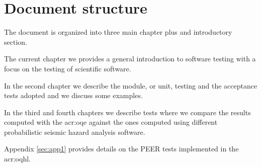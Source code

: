 \section{Document structure}
The document is organized into three main chapter plus and introductory 
section. 
 
The current chapter we provides a general introduction to software 
testing with a focus on the testing of scientific software. 
 
In the second chapter we describe the module, or unit, testing 
and the acceptance tests adopted and we discuss some examples. 
 
In the third and fourth chapters we describe tests where we compare 
the results computed with the \gls{acr:oqe} against the ones 
computed using different probabilistic seismic hazard analysis software.
  
Appendix \ref{sec:app1} provides details on the PEER tests 
implemented in the \gls{acr:oqhl}.
